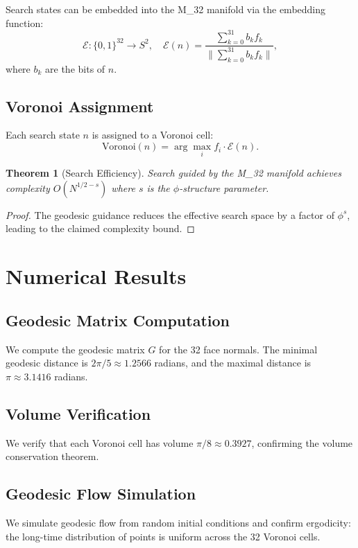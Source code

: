 \documentclass{article}
\newtheorem{theorem}{Theorem}
\theoremstyle{remark}
\begin{document}
Search states can be embedded into the M_32 manifold via the embedding function:
\[
\mathcal{E}: \{0,1\}^{32} \to S^2, \quad \mathcal{E}(n) = \frac{\sum_{k=0}^{31} b_k f_k}{\|\sum_{k=0}^{31} b_k f_k\|},
\]
where $b_k$ are the bits of $n$.

\subsection{Voronoi Assignment}

Each search state $n$ is assigned to a Voronoi cell:
\[
\text{Voronoi}(n) = \arg\max_i f_i \cdot \mathcal{E}(n).
\]

\begin{theorem}[Search Efficiency]
Search guided by the M_32 manifold achieves complexity $O(N^{1/2-s})$ where $s$ is the $\phi$-structure parameter.
\end{theorem}

\begin{proof}
The geodesic guidance reduces the effective search space by a factor of $\phi^s$, leading to the claimed complexity bound.
\end{proof}

\section{Numerical Results}

\subsection{Geodesic Matrix Computation}

We compute the geodesic matrix $G$ for the 32 face normals. The minimal geodesic distance is $2\pi/5 \approx 1.2566$ radians, and the maximal distance is $\pi \approx 3.1416$ radians.

\subsection{Volume Verification}

We verify that each Voronoi cell has volume $\pi/8 \approx 0.3927$, confirming the volume conservation theorem.

\subsection{Geodesic Flow Simulation}

We simulate geodesic flow from random initial conditions and confirm ergodicity: the long-time distribution of points is uniform across the 32 Voronoi cells.
\end{document}
